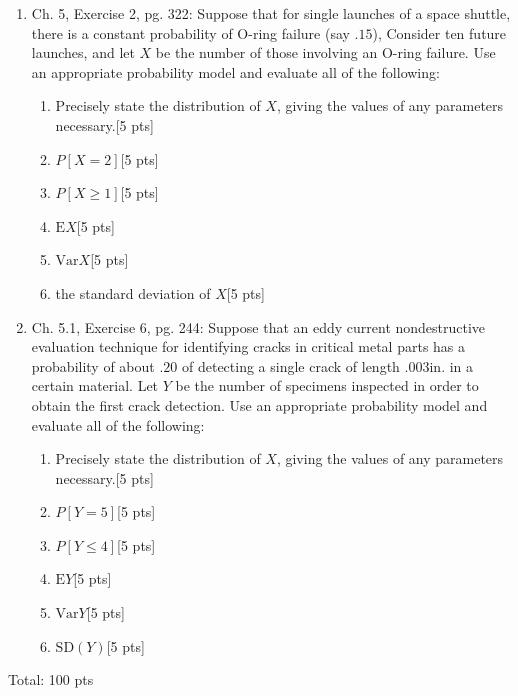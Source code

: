 \documentclass[11pt]{article}\usepackage[]{graphicx}\usepackage[]{color}
\begin{document}
\begin{enumerate}

\item Ch. 5, Exercise 2, pg. 322: Suppose that for single launches of a space shuttle, there is a constant probability of O-ring failure (say $.15$), Consider ten future launches, and let $X$ be the number of those involving an O-ring failure. Use an appropriate probability model and evaluate all of the following:
    \begin{enumerate}
          \item Precisely state the distribution of $X$, giving the values of any parameters necessary.[5 pts]
          \item $P[X = 2]$[5 pts]
          \item $P[X \ge 1]$[5 pts]
          \item $\text{E}X$[5 pts]
          \item $\text{Var} X$[5 pts]
          \item the standard deviation of $X$[5 pts]
    \end{enumerate}

\item Ch. 5.1, Exercise 6, pg. 244: Suppose that an eddy current nondestructive evaluation technique for identifying cracks in critical metal parts has a probability of about $.20$ of detecting a single crack of length $.003$in. in a certain material. Let $Y$ be the number of specimens inspected in order to obtain the first crack detection. Use an appropriate probability model and evaluate all of the following:
    \begin{enumerate}
        \item Precisely state the distribution of $X$, giving the values of any parameters necessary.[5 pts]
        \item $P[Y = 5]$[5 pts]
        \item $P[Y \le 4]$[5 pts]
        \item $\text{E}Y$[5 pts]
        \item $\text{Var}Y$[5 pts]
        \item $\text{SD}(Y)$[5 pts]
    \end{enumerate}


\end{enumerate}


Total: 100 pts
\end{document}
